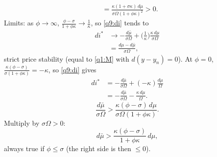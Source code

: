 \begin{sol}
\begin{align}
&=\frac{\kappa(1+\sigma\kappa)\,d\mu}{\sigma\Omega(1+\phi\kappa)^2}>0 . \nonumber
\end{align}
Limits: as $\phi\to\infty$, $\frac{\phi-\sigma}{1+\phi\kappa}\to\frac1\kappa$, so \eqref{q9:di} tends to
\begin{align}
di^*&\to-\frac{d\bar\mu}{\sigma\Omega}+\Big(\frac1\kappa\Big)\frac{\kappa\,d\mu}{\sigma\Omega}\nonumber\\
&=\frac{d\mu-d\bar\mu}{\sigma\Omega} , \nonumber
\end{align}
strict price stability (equal to \eqref{q1:M} with $d(y-y_n)=0$). At $\phi=0$, $\frac{\kappa(\phi-\sigma)}{\sigma(1+\phi\kappa)}=-\kappa$, so \eqref{q9:di} gives
\begin{align}
di^*&=-\frac{d\bar\mu}{\sigma\Omega}+(-\kappa)\frac{d\mu}{\Omega}\nonumber\\
&=-\frac{d\bar\mu}{\sigma\Omega}-\frac{\kappa\,d\mu}{\Omega} . \nonumber
\end{align}
\begin{equation}
\frac{d\bar\mu}{\sigma\Omega}>\frac{\kappa(\phi-\sigma)\,d\mu}{\sigma\Omega(1+\phi\kappa)} . \nonumber
\end{equation}
Multiply by $\sigma\Omega>0$:
\begin{equation}
d\bar\mu>\frac{\kappa(\phi-\sigma)}{1+\phi\kappa}\,d\mu , \label{q9:cut}
\end{equation}
always true if $\phi\le\sigma$ (the right side is then $\le0$).
\end{sol}

